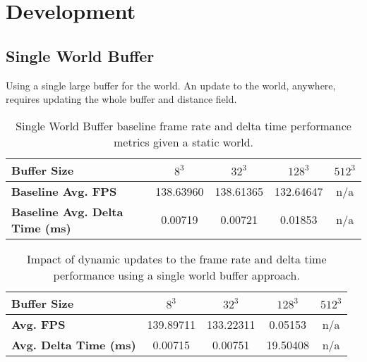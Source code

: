 \chapter{Development}

\section{Single World Buffer}

Using a single large buffer for the world. An update to the world, anywhere, requires updating the whole buffer and distance field.

\begin{table}[h!]
    \centering
    \caption{Single World Buffer baseline frame rate and delta time performance metrics given a static world.}
    \label{tab:single_buffer_baseline}
    \vspace{0.5em}
    \begin{tabular}{l|*{4}{c}}
        \toprule
        \textbf{Buffer Size}                   & \textbf{$8^3$} & \textbf{$32^3$} & \textbf{$128^3$} & \textbf{$512^3$} \\
        \midrule
        \textbf{Baseline Avg. FPS}             & 138.63960      & 138.61365       & 132.64647        & n/a              \\
        \textbf{Baseline Avg. Delta Time (ms)} & 0.00719        & 0.00721         & 0.01853          & n/a              \\
        \bottomrule
    \end{tabular}
\end{table}

\begin{table}[h!]
    \centering
    \caption{Impact of dynamic updates to the frame rate and delta time performance using a single world buffer approach.}
    \label{tab:single_buffer_fps}
    \vspace{0.5em}
    \begin{tabular}{l|*{4}{c}}
        \toprule
        \textbf{Buffer Size}          & \textbf{$8^3$} & \textbf{$32^3$} & \textbf{$128^3$} & \textbf{$512^3$} \\
        \midrule
        \textbf{Avg. FPS}             & 139.89711      & 133.22311       & 0.05153          & n/a              \\
        \textbf{Avg. Delta Time (ms)} & 0.00715        & 0.00751         & 19.50408         & n/a              \\
        \bottomrule
    \end{tabular}
\end{table}


